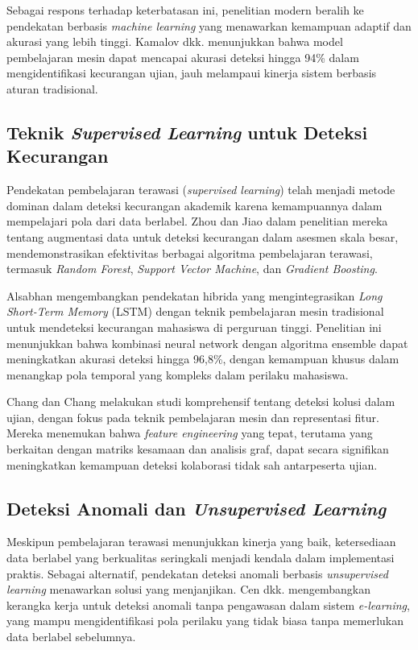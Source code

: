 Sebagai respons terhadap keterbatasan ini, penelitian modern beralih ke pendekatan berbasis \textit{machine learning} yang menawarkan kemampuan adaptif dan akurasi yang lebih tinggi. Kamalov dkk. \cite{Kamalov2021} menunjukkan bahwa model pembelajaran mesin dapat mencapai akurasi deteksi hingga 94\% dalam mengidentifikasi kecurangan ujian, jauh melampaui kinerja sistem berbasis aturan tradisional.

\subsection{Teknik \textit{Supervised Learning} untuk Deteksi Kecurangan}

Pendekatan pembelajaran terawasi (\textit{supervised learning}) telah menjadi metode dominan dalam deteksi kecurangan akademik karena kemampuannya dalam mempelajari pola dari data berlabel. Zhou dan Jiao \cite{Zhou2022} dalam penelitian mereka tentang augmentasi data untuk deteksi kecurangan dalam asesmen skala besar, mendemonstrasikan efektivitas berbagai algoritma pembelajaran terawasi, termasuk \textit{Random Forest}, \textit{Support Vector Machine}, dan \textit{Gradient Boosting}.

Alsabhan \cite{Alsabhan2023} mengembangkan pendekatan hibrida yang mengintegrasikan \textit{Long Short-Term Memory} (LSTM) dengan teknik pembelajaran mesin tradisional untuk mendeteksi kecurangan mahasiswa di perguruan tinggi. Penelitian ini menunjukkan bahwa kombinasi neural network dengan algoritma ensemble dapat meningkatkan akurasi deteksi hingga 96,8\%, dengan kemampuan khusus dalam menangkap pola temporal yang kompleks dalam perilaku mahasiswa.

Chang dan Chang \cite{Chang2023} melakukan studi komprehensif tentang deteksi kolusi dalam ujian, dengan fokus pada teknik pembelajaran mesin dan representasi fitur. Mereka menemukan bahwa \textit{feature engineering} yang tepat, terutama yang berkaitan dengan matriks kesamaan dan analisis graf, dapat secara signifikan meningkatkan kemampuan deteksi kolaborasi tidak sah antarpeserta ujian.

\subsection{Deteksi Anomali dan \textit{Unsupervised Learning}}

Meskipun pembelajaran terawasi menunjukkan kinerja yang baik, ketersediaan data berlabel yang berkualitas seringkali menjadi kendala dalam implementasi praktis. Sebagai alternatif, pendekatan deteksi anomali berbasis \textit{unsupervised learning} menawarkan solusi yang menjanjikan. Cen dkk. \cite{survey:anomaly_detection_edu} mengembangkan kerangka kerja untuk deteksi anomali tanpa pengawasan dalam sistem \textit{e-learning}, yang mampu mengidentifikasi pola perilaku yang tidak biasa tanpa memerlukan data berlabel sebelumnya.

